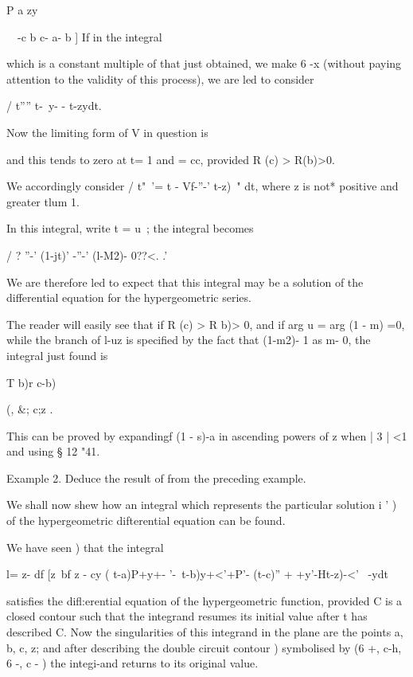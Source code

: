 P a zy

\ \ -c b c- a- b ] If in the integral

which is a constant multiple of that just obtained, we make 6 -x
(without paying attention to the validity of this process), we are led
to consider

/ t'''' t-\ y- - t-zydt.

Now the limiting form of V in question is

and this tends to zero at t= 1 and = cc, provided R (c) > R(b)>0.

We accordingly consider / t"~'= t - Vf-''-' t-z)~" dt, where z is not*
positive and greater tlum 1.

In this integral, write t = u~; the integral becomes

/ ? ''-' (1-jt)' -''-' (l-M2)- 0??<. .'

We are therefore led to expect that this integral may be a solution of
the differential equation for the hypergeometric series.

The reader will easily see that if R (c) > R b)> 0, and if arg u = arg
(1 - m) =0, while the branch of l-uz is specified by the fact that
(1-m2)- 1 as m- 0, the integral just found is

T b)r c-b)

  (, \&; c;z .

This can be proved by expandingf (1 - s)-a in ascending powers of z
when | 3 | <1 and using § 12 "41.

Example 2. Deduce the result of from the preceding example.


We shall now shew how an integral which represents the particular
solution i ' ) of the hypergeometric difterential equation can
be found.

We have seen ) that the integral

l= z- df [z~bf z - cy ( t-a)P+y+- '-\ t-b)y+<'+P'- (t-c)'' +
+y'-Ht-z)-<'~ -ydt

satisfies the difl:erential equation of the hypergeometric function,
provided C is a closed contour such that the integrand resumes its
initial value after t has described C. Now the singularities of this
integrand in the plane are the points a, b, c, z; and after describing
the double circuit contour ) symbolised by (6 +, c-h, 6 -, c
- ) the integi-and returns to its original value.


